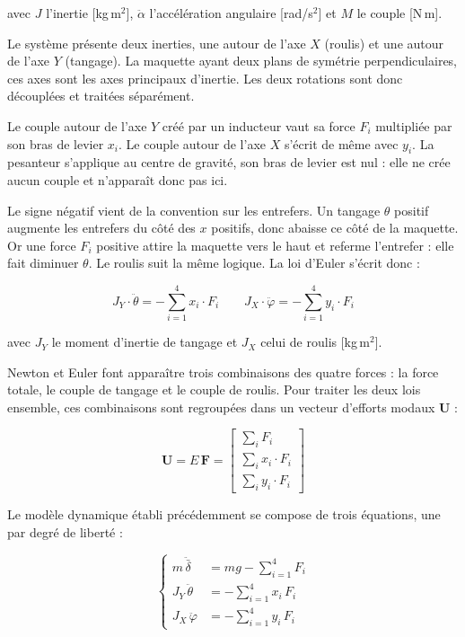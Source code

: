 avec $J$ l'inertie [kg\,m$^2$], $\ddot{\alpha}$ l'accélération angulaire [rad/s$^2$] et $M$ le couple [N\,m].

Le système présente deux inerties, une autour de l'axe $X$ (roulis) et une autour de l'axe $Y$ (tangage). La maquette ayant deux plans de symétrie perpendiculaires, ces axes sont les axes principaux d'inertie. Les deux rotations sont donc découplées et traitées séparément.

Le couple autour de l'axe $Y$ créé par un inducteur vaut sa force $F_i$ multipliée par son bras de levier $x_i$. Le couple autour de l'axe $X$ s'écrit de même avec $y_i$. La pesanteur s'applique au centre de gravité, son bras de levier est nul : elle ne crée aucun couple et n'apparaît donc pas ici.

Le signe négatif vient de la convention sur les entrefers. Un tangage $\theta$ positif augmente les entrefers du côté des $x$ positifs, donc abaisse ce côté de la maquette. Or une force $F_i$ positive attire la maquette vers le haut et referme l'entrefer : elle fait diminuer $\theta$. Le roulis suit la même logique. La loi d'Euler s'écrit donc :

\begin{equation}
    J_Y \cdot \ddot\theta = -\sum_{i=1}^{4} x_i\cdot F_i
    \qquad
    J_X \cdot \ddot\varphi = -\sum_{i=1}^{4} y_i\cdot F_i
    \label{eq:euler-mimo}
\end{equation}

avec $J_Y$ le moment d'inertie de tangage et $J_X$ celui de roulis [kg\,m$^2$].

Newton et Euler font apparaître trois combinaisons des quatre forces : la force totale, le couple de tangage et le couple de roulis. Pour traiter les deux lois ensemble, ces combinaisons sont regroupées dans un vecteur d'efforts modaux $\boldsymbol U$ :

\begin{equation}
    \boldsymbol{U} = E\,\boldsymbol{F}
    = \begin{bmatrix}
        \sum_i F_i          \\[3pt]
        \sum_i x_i\cdot F_i \\[3pt]
        \sum_i y_i\cdot F_i
    \end{bmatrix}
    \label{eq:efforts-modaux}
\end{equation}

Le modèle dynamique établi précédemment se compose de trois équations,
une par degré de liberté :

\begin{equation*}
    \left\{
    \begin{aligned}
        m\,\ddot{\bar\delta} & = m g - \sum_{i=1}^{4} F_i  \\[4pt]
        J_Y\,\ddot\theta     & = - \sum_{i=1}^{4} x_i\,F_i \\[4pt]
        J_X\,\ddot\varphi    & = - \sum_{i=1}^{4} y_i\,F_i
    \end{aligned}
    \right.
\end{equation*}


